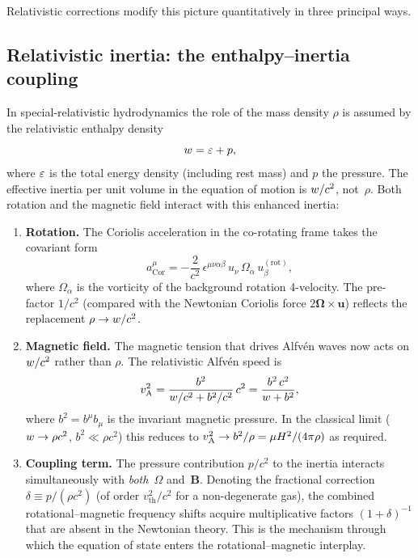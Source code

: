 Relativistic corrections modify this picture quantitatively in three
principal ways.

\subsection{Relativistic inertia: the enthalpy--inertia coupling}

In special-relativistic hydrodynamics the role of the mass density
$\rho$ is assumed by the relativistic enthalpy density
\begin{equation}
  w = \varepsilon + p,
  \label{eq:rel49-enthalpy}
\end{equation}
where $\varepsilon$ is the total energy density (including rest mass) and
$p$ the pressure.  The effective inertia per unit volume in the equation
of motion is $w/c^{2}$, not~$\rho$.  Both rotation and the
magnetic field interact with this enhanced inertia:

\begin{enumerate}
\item \textbf{Rotation.}  The Coriolis acceleration in the co-rotating
  frame takes the covariant form
  \begin{equation}
    a^{\mu}_{\text{Cor}}
      = -\frac{2}{c^{2}}\,\epsilon^{\mu\nu\alpha\beta}\,
        u_{\nu}\,\Omega_{\alpha}\,u_{\beta}^{(\text{rot})},
    \label{eq:rel49-coriolis}
  \end{equation}
  where $\Omega_{\alpha}$ is the vorticity of the background rotation
  4-velocity.  The pre-factor $1/c^{2}$ (compared with the Newtonian
  Coriolis force $2\boldsymbol{\Omega}\times\mathbf{u}$) reflects the
  replacement $\rho\to w/c^{2}$.

\item \textbf{Magnetic field.}  The magnetic tension that drives
  Alfv\'en waves now acts on $w/c^{2}$ rather than $\rho$.
  The relativistic Alfv\'en speed is
  \begin{equation}
    v_{\mathrm{A}}^{2}
      = \frac{b^{2}}{w/c^{2} + b^{2}/c^{2}}\,c^{2}
      = \frac{b^{2}\,c^{2}}{w + b^{2}},
    \label{eq:rel49-vA}
  \end{equation}
  where $b^{2}=b^{\mu}b_{\mu}$ is the invariant magnetic pressure.
  In the classical limit ($w\to\rho c^{2}$,
  $b^{2}\ll\rho c^{2}$) this reduces to
  $v_{\mathrm{A}}^{2}\to b^{2}/\rho = \mu H^{2}/(4\pi\rho)$ as required.

\item \textbf{Coupling term.}  The pressure contribution $p/c^{2}$
  to the inertia interacts simultaneously with \emph{both}~$\Omega$
  and~$\mathbf{B}$.  Denoting the fractional correction
  $\delta\equiv p/(\rho c^{2})$ (of order $v_{\text{th}}^{2}/c^{2}$
  for a non-degenerate gas), the combined rotational--magnetic
  frequency shifts acquire multiplicative factors $(1+\delta)^{-1}$
  that are absent in the Newtonian theory.  This is the mechanism
  through which the equation of state enters the rotational--magnetic
  interplay.
\end{enumerate}

